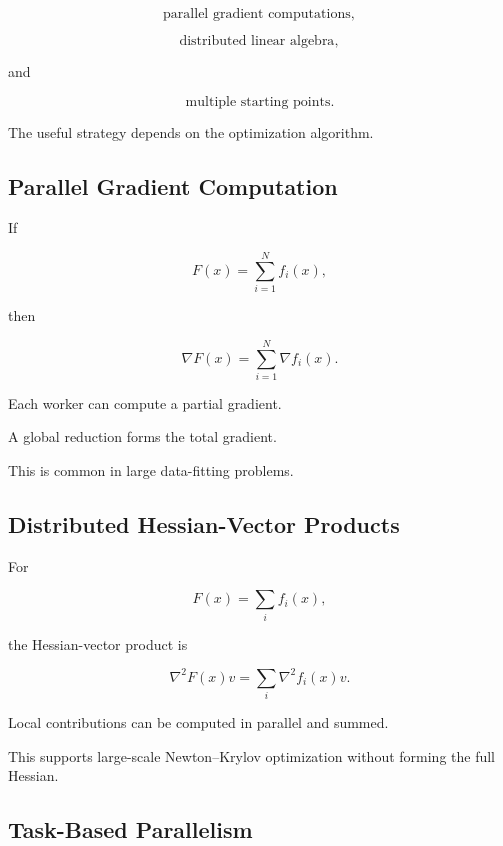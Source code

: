 \[
\boxed{
\text{parallel gradient computations},
}
\]

\[
\boxed{
\text{distributed linear algebra},
}
\]

and

\[
\boxed{
\text{multiple starting points}.
}
\]

The useful strategy depends on the optimization algorithm.

\subsection{Parallel Gradient Computation}
\label{subsec:parallel-gradient-computation}

If

\[
F(x)
=
\sum_{i=1}^{N}
f_i(x),
\]

then

\[
\boxed{
\nabla F(x)
=
\sum_{i=1}^{N}
\nabla f_i(x).
}
\]

Each worker can compute a partial gradient.

A global reduction forms the total gradient.

This is common in large data-fitting problems.

\subsection{Distributed Hessian-Vector Products}
\label{subsec:distributed-hessian-vector}

For

\[
F(x)
=
\sum_i f_i(x),
\]

the Hessian-vector product is

\[
\boxed{
\nabla^2F(x)v
=
\sum_i
\nabla^2f_i(x)v.
}
\]

Local contributions can be computed in parallel and summed.

This supports large-scale Newton--Krylov optimization without forming the
full Hessian.

\subsection{Task-Based Parallelism}
\label{subsec:task-based-parallelism}

